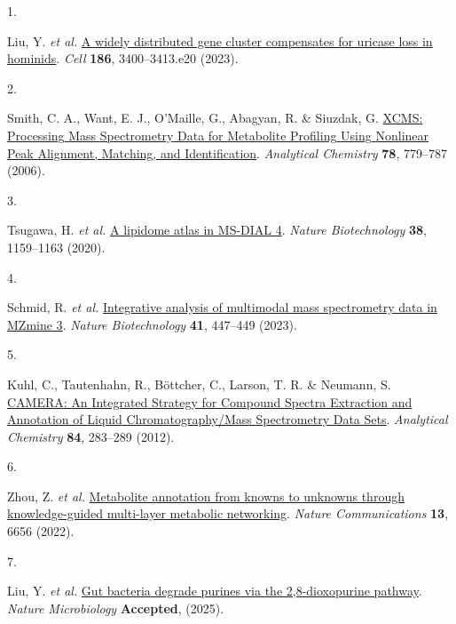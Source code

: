 \documentclass[
  letterpaper,
  DIV=11,
  numbers=noendperiod]{scrreprt}
\newlength{\cslhangindent}
\newlength{\csllabelwidth}
\newenvironment{CSLReferences}[2] %
 {\begin{list}{}{%
  \setlength{\itemindent}{0pt}
  \setlength{\leftmargin}{0pt}
  \setlength{\parsep}{0pt}
  \ifodd #1
   \setlength{\leftmargin}{\cslhangindent}
   \setlength{\itemindent}{-1\cslhangindent}
  \fi
  \setlength{\itemsep}{#2\baselineskip}}}
 {\end{list}}
\newcommand{\CSLLeftMargin}[1]{\parbox[t]{\csllabelwidth}{\strut#1\strut}}
\newcommand{\CSLRightInline}[1]{\parbox[t]{\linewidth - \csllabelwidth}{\strut#1\strut}}
\begin{document}
\label{refs}
\begin{CSLReferences}{0}{0}
\CSLLeftMargin{1. }%
\CSLRightInline{Liu, Y. \emph{et al.}
\href{https://doi.org/10.1016/j.cell.2023.06.010}{A widely distributed
gene cluster compensates for uricase loss in hominids}. \emph{Cell}
\textbf{186}, 3400--3413.e20 (2023).}

\CSLLeftMargin{2. }%
\CSLRightInline{Smith, C. A., Want, E. J., O'Maille, G., Abagyan, R. \&
Siuzdak, G. \href{https://doi.org/10.1021/ac051437y}{{XCMS}:
{Processing} {Mass} {Spectrometry} {Data} for {Metabolite} {Profiling}
{Using} {Nonlinear} {Peak} {Alignment}, {Matching}, and
{Identification}}. \emph{Analytical Chemistry} \textbf{78}, 779--787
(2006).}

\CSLLeftMargin{3. }%
\CSLRightInline{Tsugawa, H. \emph{et al.}
\href{https://doi.org/10.1038/s41587-020-0531-2}{A lipidome atlas in
{MS}-{DIAL} 4}. \emph{Nature Biotechnology} \textbf{38}, 1159--1163
(2020).}

\CSLLeftMargin{4. }%
\CSLRightInline{Schmid, R. \emph{et al.}
\href{https://doi.org/10.1038/s41587-023-01690-2}{Integrative analysis
of multimodal mass spectrometry data in {MZmine} 3}. \emph{Nature
Biotechnology} \textbf{41}, 447--449 (2023).}

\CSLLeftMargin{5. }%
\CSLRightInline{Kuhl, C., Tautenhahn, R., Böttcher, C., Larson, T. R. \&
Neumann, S. \href{https://doi.org/10.1021/ac202450g}{{CAMERA}: {An}
{Integrated} {Strategy} for {Compound} {Spectra} {Extraction} and
{Annotation} of {Liquid} {Chromatography}/{Mass} {Spectrometry} {Data}
{Sets}}. \emph{Analytical Chemistry} \textbf{84}, 283--289 (2012).}

\CSLLeftMargin{6. }%
\CSLRightInline{Zhou, Z. \emph{et al.}
\href{https://doi.org/10.1038/s41467-022-34537-6}{Metabolite annotation
from knowns to unknowns through knowledge-guided multi-layer metabolic
networking}. \emph{Nature Communications} \textbf{13}, 6656 (2022).}

\CSLLeftMargin{7. }%
\CSLRightInline{Liu, Y. \emph{et al.}
\href{https://doi.org/10.1101/2025.04.24.650524}{Gut bacteria degrade
purines via the 2,8-dioxopurine pathway}. \emph{Nature Microbiology}
\textbf{Accepted}, (2025).}

\end{CSLReferences}
\end{document}
